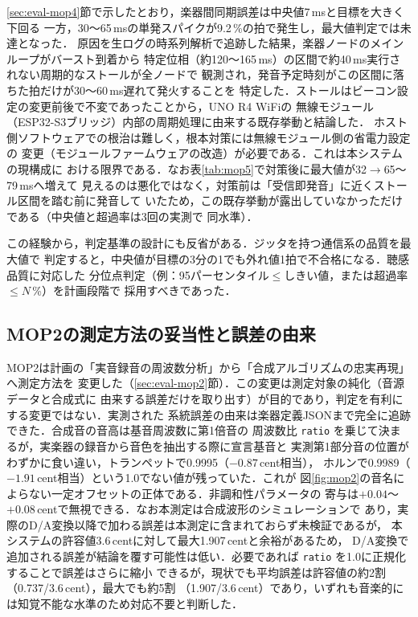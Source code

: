 \documentclass[uplatex,dvipdfmx]{jlreq}
\newcommand{\code}[1]{\texttt{#1}}
\begin{document}
\ref{sec:eval-mop4}節で示したとおり，楽器間同期誤差は中央値7\,msと目標を大きく下回る
一方，30〜65\,msの単発スパイクが9.2\,\%の拍で発生し，最大値判定では未達となった．
原因を生ログの時系列解析で追跡した結果，楽器ノードのメインループがバースト到着から
特定位相（約120〜165\,ms）の区間で約40\,ms実行されない周期的なストールが全ノードで
観測され，発音予定時刻がこの区間に落ちた拍だけが30〜60\,ms遅れて発火することを
特定した．ストールはビーコン設定の変更前後で不変であったことから，UNO R4 WiFiの
無線モジュール（ESP32-S3ブリッジ）内部の周期処理に由来する既存挙動と結論した．
ホスト側ソフトウェアでの根治は難しく，根本対策には無線モジュール側の省電力設定の
変更（モジュールファームウェアの改造）が必要である．これは本システムの現構成に
おける限界である．なお表\ref{tab:mop5}で対策後に最大値が32$\to$65〜79\,msへ増えて
見えるのは悪化ではなく，対策前は「受信即発音」に近くストール区間を踏む前に発音して
いたため，この既存挙動が露出していなかっただけである（中央値と超過率は3回の実測で
同水準）．

この経験から，判定基準の設計にも反省がある．ジッタを持つ通信系の品質を最大値で
判定すると，中央値が目標の3分の1でも外れ値1拍で不合格になる．聴感品質に対応した
分位点判定（例：95パーセンタイル$\le$しきい値，または超過率$\le N$\,\%）を計画段階で
採用すべきであった．

\subsection{MOP2の測定方法の妥当性と誤差の由来}\label{sec:disc-mop2}

MOP2は計画の「実音録音の周波数分析」から「合成アルゴリズムの忠実再現」へ測定方法を
変更した（\ref{sec:eval-mop2}節）．この変更は測定対象の純化（音源データと合成式に
由来する誤差だけを取り出す）が目的であり，判定を有利にする変更ではない．実測された
系統誤差の由来は楽器定義JSONまで完全に追跡できた．合成音の音高は基音周波数に第1倍音の
周波数比 \code{ratio} を乗じて決まるが，実楽器の録音から音色を抽出する際に宣言基音と
実測第1部分音の位置がわずかに食い違い，トランペットで0.9995（$-0.87$\,cent相当），
ホルンで0.9989（$-1.91$\,cent相当）という1.0でない値が残っていた．これが
図\ref{fig:mop2}の音名によらない一定オフセットの正体である．非調和性パラメータの
寄与は$+0.04$〜$+0.08$\,centで無視できる．なお本測定は合成波形のシミュレーションで
あり，実際のD/A変換以降で加わる誤差は本測定に含まれておらず未検証であるが，
本システムの許容値3.6\,centに対して最大1.907\,centと余裕があるため，
D/A変換で追加される誤差が結論を覆す可能性は低い．必要であれば \code{ratio} を1.0に正規化することで誤差はさらに縮小
できるが，現状でも平均誤差は許容値の約2割（0.737/3.6\,cent），最大でも約5割
（1.907/3.6\,cent）であり，いずれも音楽的には知覚不能な水準のため対応不要と判断した．
\end{document}
